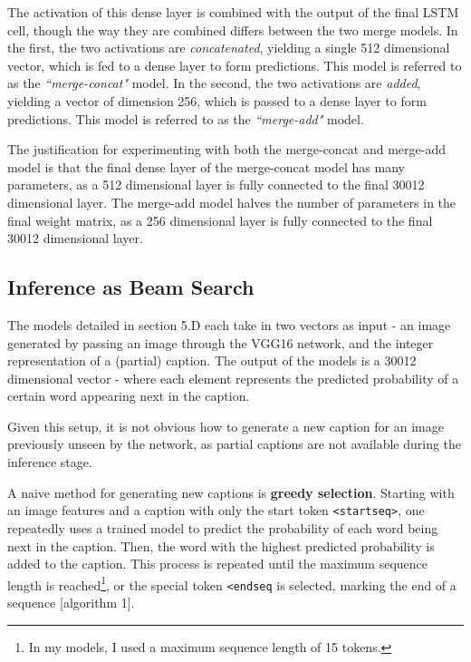 \documentclass[letterpaper, 10 pt, conference]{ieeeconf}
\begin{document}
The activation of this dense layer is combined with the output of the final LSTM cell, though the way they are combined differs between the two merge models. In the first, the two activations are \textit{concatenated}, yielding a single 512 dimensional vector, which is fed to a dense layer to form predictions. This model is referred to as the \textit{``merge-concat"} model. In the second, the two activations are \textit{added}, yielding a vector of dimension 256, which is passed to a dense layer to form predictions. This model is referred to as the \textit{``merge-add"} model.

The justification for experimenting with both the merge-concat and merge-add model is that the final dense layer of the merge-concat model has many parameters, as a 512 dimensional layer is fully connected to the final 30012 dimensional layer. The merge-add model halves the number of parameters in the final weight matrix, as a 256 dimensional layer is fully connected to the final 30012 dimensional layer.


\subsection{Inference as Beam Search}

The models detailed in section 5.D each take in two vectors as input - an image generated by passing an image through the VGG16 network, and the integer representation of a (partial) caption. The output of the models is a 30012 dimensional vector - where each element represents the predicted probability of a certain word appearing next in the caption. 

Given this setup, it is not obvious how to generate a new caption for an image previously unseen by the network, as partial captions are not available during the inference stage. 

A naive method for generating new captions is \textbf{greedy selection}. Starting with an image features and a caption with only the start token \texttt{<startseq>}, one repeatedly uses a trained model to predict the probability of each word being next in the caption. Then, the word with the highest predicted probability is added to the caption. This process is repeated until the maximum sequence length is reached\footnote{In my models, I used a maximum sequence length of 15 tokens.}, or the special token \texttt{<endseq} is selected, marking the end of a sequence [algorithm 1].
\end{document}

